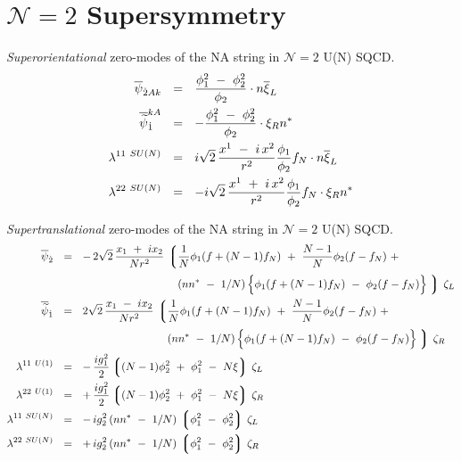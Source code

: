 \documentclass{article}
\newcommand{\wt}{\widetilde}
\newcommand{\ov}{\overline}
\newcommand{\lgr}{\left\lgroup}
\newcommand{\rgr}{\right\rgroup}
\begin{document}
\section{$\mathcal{N}=2$ Supersymmetry}

 {\it Superorientational} zero-modes of the NA string in ${\mathcal N}=2$ U(N) SQCD.
\begin{align}
\label{N2_sorient}
%
\notag
\overline{\psi}_{\dot{2}Ak} & ~~=~~ \frac{\phi_1^2 ~-~ \phi_2^2}{\phi_2} \cdot n \overline{\xi}_L   \\
%
\notag
\overline{\wt{\psi}}_{\dot{1}}^{kA}  & ~~=~~ - \frac{\phi_1^2 ~-~ \phi_2^2}{\phi_2} \cdot \xi_R n^*  \\
%
\lambda^{11\ SU(N)} & ~~=~~ i \sqrt{2}\, \frac{ x^1 ~-~ i\, x^2 }{r^2} \frac{\phi_1}{\phi_2} f_N \cdot n \overline{\xi}_L \\
%
\notag
\lambda^{22\ SU(N)} & ~~=~~ - i \sqrt{2}\, \frac{ x^1 ~+~ i\, x^2 }{r^2} \frac{\phi_1}{\phi_2} f_N \cdot \xi_R n^* 
\end{align}

 {\it Supertranslational} zero-modes of the NA string in ${\mathcal N}=2$ U(N) SQCD.
\begin{align}
\label{N2_strans}
%
\notag
\ov{\psi}_{\dot{2}}	& ~~=~~  -\,  2\sqrt{2}\, \frac{x_1 ~+~ i x_2}{N r^2} \,
		\lgr \frac{1}{N} \phi_1 ( f + (N-1) f_N ) ~+~ \frac{N-1}{N} \phi_2 ( f - f_N ) ~+~ \right.
		\\
%
\notag
			& \phantom{~~=~~  -\,  2\sqrt{2}\, \frac{x_1 ~+~ i x_2}{N r^2} \,\lgr \right.}
			\left( nn^* ~-~ 1/N \right )
			\Bigl\{ \phi_1 ( f + ( N-1 ) f_N ) ~-~ \phi_2 ( f - f_N) \Bigr\}
		\left. \rgr\, \zeta_L 
		\\
%
\notag
\ov{\wt{\psi}}_{\dot{1}} & ~~=~~    2\sqrt{2} \, \frac{x_1 ~-~ i x_2}{N r^2} \,
		\lgr \frac{1}{N} \phi_1 ( f + (N-1) f_N ) ~+~ \frac{N-1}{N} \phi_2 ( f - f_N ) ~+~ \right.
		\\
%
\notag
			& \phantom{~~=~~    2\sqrt{2} \, \frac{x_1 ~-~ i x_2}{N r^2} \,\lgr \right.}
			\left( nn^* ~-~ 1/N \right )
			\Bigl\{ \phi_1 ( f + ( N-1 ) f_N ) ~-~ \phi_2 ( f - f_N) \Bigr\}
		\left. \rgr\, \zeta_R
		\\
%
\lambda^{11\ U(1)} 	& ~~=~~ -\, \frac{i g_1^2}{2} \lgr (N-1)\phi_2^2  ~+~ \phi_1^2 ~-~ N\xi \rgr \, \zeta_L 
		\\
%
\notag
\lambda^{22\ U(1)} 	& ~~=~~ +\, \frac{i g_1^2}{2} \lgr (N-1)\phi_2^2  ~+~ \phi_1^2 ~-~ N\xi \rgr \, \zeta_R 
		\\
%
\notag
\lambda^{11\ SU(N)}	& ~~=~~ -\, {i g_2^2}\, ( nn^* ~-~ 1/N )\, \lgr \phi_1^2 ~-~ \phi_2^2 \rgr\, \zeta_L
		\\
%
\notag
\lambda^{22\ SU(N)}	& ~~=~~ +\, {i g_2^2}\, ( nn^* ~-~ 1/N )\, \lgr \phi_1^2 ~-~ \phi_2^2 \rgr\, \zeta_R
\end{align}
\end{document}
